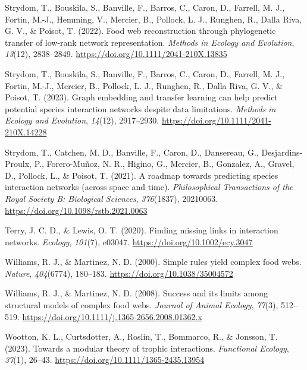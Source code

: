 \documentclass[
]{article}
\newlength{\cslhangindent}
\newenvironment{CSLReferences}[2] %
 {\begin{list}{}{%
  \setlength{\itemindent}{0pt}
  \setlength{\leftmargin}{0pt}
  \setlength{\parsep}{0pt}
  \ifodd #1
   \setlength{\leftmargin}{\cslhangindent}
   \setlength{\itemindent}{-1\cslhangindent}
  \fi
  \setlength{\itemsep}{#2\baselineskip}}}
 {\end{list}}
\begin{document}
\begin{CSLReferences}{1}{0}
Strydom, T., Bouskila, S., Banville, F., Barros, C., Caron, D., Farrell,
M. J., Fortin, M.-J., Hemming, V., Mercier, B., Pollock, L. J., Runghen,
R., Dalla Riva, G. V., \& Poisot, T. (2022). Food web reconstruction
through phylogenetic transfer of low-rank network representation.
\emph{Methods in Ecology and Evolution}, \emph{13}(12), 2838--2849.
\url{https://doi.org/10.1111/2041-210X.13835}

Strydom, T., Bouskila, S., Banville, F., Barros, C., Caron, D., Farrell,
M. J., Fortin, M.-J., Mercier, B., Pollock, L. J., Runghen, R., Dalla
Riva, G. V., \& Poisot, T. (2023). Graph embedding and transfer learning
can help predict potential species interaction networks despite data
limitations. \emph{Methods in Ecology and Evolution}, \emph{14}(12),
2917--2930. \url{https://doi.org/10.1111/2041-210X.14228}

Strydom, T., Catchen, M. D., Banville, F., Caron, D., Dansereau, G.,
Desjardins-Proulx, P., Forero-Muñoz, N. R., Higino, G., Mercier, B.,
Gonzalez, A., Gravel, D., Pollock, L., \& Poisot, T. (2021). A roadmap
towards predicting species interaction networks (across space and time).
\emph{Philosophical Transactions of the Royal Society B: Biological
Sciences}, \emph{376}(1837), 20210063.
\url{https://doi.org/10.1098/rstb.2021.0063}

Terry, J. C. D., \& Lewis, O. T. (2020). Finding missing links in
interaction networks. \emph{Ecology}, \emph{101}(7), e03047.
\url{https://doi.org/10.1002/ecy.3047}

Williams, R. J., \& Martinez, N. D. (2000). Simple rules yield complex
food webs. \emph{Nature}, \emph{404}(6774), 180--183.
\url{https://doi.org/10.1038/35004572}

Williams, R. J., \& Martinez, N. D. (2008). Success and its limits among
structural models of complex food webs. \emph{Journal of Animal
Ecology}, \emph{77}(3), 512--519.
\url{https://doi.org/10.1111/j.1365-2656.2008.01362.x}

Wootton, K. L., Curtsdotter, A., Roslin, T., Bommarco, R., \& Jonsson,
T. (2023). Towards a modular theory of trophic interactions.
\emph{Functional Ecology}, \emph{37}(1), 26--43.
\url{https://doi.org/10.1111/1365-2435.13954}


\end{CSLReferences}
\end{document}
